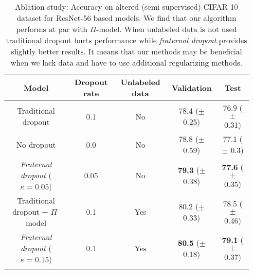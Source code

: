 \documentclass{article} %
\begin{document}
\begin{table}[t]
\vspace{-0.08cm}
\centering
\begin{tabular}{c | c c c c} 
\textbf{Model} & \textbf{Dropout rate} & \textbf{Unlabeled data} & \textbf{Validation} & \textbf{Test}\\
\hline
Traditional dropout & 0.1 & No & 78.4 ($\pm$ 0.25) & 76.9 ($\pm$ 0.31)\\
No dropout & 0.0 & No & 78.8 ($\pm$ 0.59) & 77.1 ($\pm$ 0.3)\\
\emph{Fraternal dropout} ($\kappa=0.05$)& 0.05 & No &  \textbf{79.3} ($\pm$ 0.38) & \textbf{77.6} ($\pm$ 0.35)\\
\hline
Traditional dropout + $\Pi$-model & 0.1 & Yes & 80.2 ($\pm$ 0.33) & 78.5 ($\pm$ 0.46)\\
\emph{Fraternal dropout} ($\kappa=0.15$) & 0.1 & Yes & \textbf{80.5} ($\pm$ 0.18) & \textbf{79.1} ($\pm$ 0.37)\\
\vspace{-0.08cm}
\end{tabular}
\caption{Ablation study: Accuracy on altered (semi-supervised) CIFAR-10 dataset for ResNet-56 based models. We find that our algorithm performs at par with $\Pi$-model. When unlabeled data is not used traditional dropout hurts performance while \emph{fraternal dropout} provides slightly better results. It means that our methods may be beneficial when we lack data and have to use additional regularizing methods.}
\label{table:CIFAR-10}
\end{table}
\end{document}
